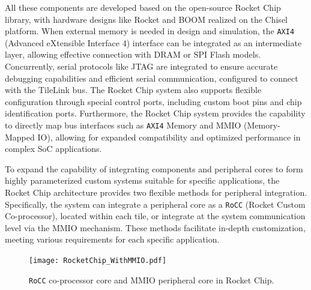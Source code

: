 
All these components are developed based on the open-source Rocket Chip library, with hardware designs like Rocket and BOOM realized on the Chisel platform. When external memory is needed in design and simulation, the \texttt{AXI4} (Advanced eXtensible Interface 4) interface can be integrated as an intermediate layer, allowing effective connection with DRAM or SPI Flash models. Concurrently, serial protocols like JTAG are integrated to ensure accurate debugging capabilities and efficient serial communication, configured to connect with the TileLink bus. The Rocket Chip system also supports flexible configuration through special control ports, including custom boot pins and chip identification ports. Furthermore, the Rocket Chip system provides the capability to directly map bus interfaces such as \texttt{AXI4} Memory and MMIO (Memory-Mapped IO), allowing for expanded compatibility and optimized performance in complex SoC applications.

To expand the capability of integrating components and peripheral cores to form highly parameterized custom systems suitable for specific applications, the Rocket Chip architecture provides two flexible methods for peripheral integration. Specifically, the system can integrate a peripheral core as a \texttt{RoCC} (Rocket Custom Co-processor), located within each tile, or integrate at the system communication level via the MMIO mechanism. These methods facilitate in-depth customization, meeting various requirements for each specific application.

\begin{figure}[h!]
    \centering
    \texttt{[image: RocketChip\_WithMMIO.pdf]}
    \caption{\texttt{RoCC} co-processor core and MMIO peripheral core in Rocket Chip.}
    \label{fig:rocc_mmio_rocketchip}
\end{figure}

